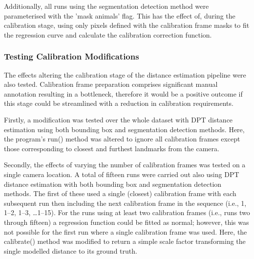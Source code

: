 Additionally, all runs using the segmentation detection method were parameterised with the
'mask animals' flag.
This has the effect of, during the calibration stage, using only pixels defined with the calibration
frame masks to fit the regression curve and calculate the calibration correction function.

\subsubsection{Testing Calibration Modifications}

The effects altering the calibration stage of the distance estimation pipeline were also tested.
Calibration frame preparation comprises significant manual annotation resulting in a bottleneck,
therefore it would be a positive outcome if this stage could be streamlined with a reduction in
calibration requirements.

Firstly, a modification was tested over the whole dataset with DPT distance estimation using both
bounding box and segmentation detection methods.
Here, the program's run() method was altered to ignore all calibration frames except those corresponding
to closest and furthest landmarks from the camera.

Secondly, the effects of varying the number of calibration frames was tested on a single camera
location.
A total of fifteen runs were carried out also using DPT distance estimation with both bounding box
and segmentation detection methods.
The first of these used a single (closest) calibration frame with each subsequent run then including
the next calibration frame in the sequence (i.e., 1, 1–2, 1–3, \ldots 1–15).
For the runs using at least two calibration frames (i.e., runs two through fifteen) a regression
function could be fitted as normal; however, this was not possible for the first run where a single
calibration frame was used.
Here, the calibrate() method was modified to return a simple scale factor transforming the single
modelled distance to its ground truth.